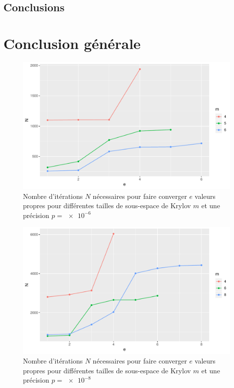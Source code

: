 \documentclass[11pt,a4paper]{article}
\begin{document}
	\subsection{Conclusions}

\section{Conclusion générale}

\begin{figure}
	\centering
	\includegraphics[width=0.8\linewidth, keepaspectratio]{plots/Nvse-m_p6.pdf}
	\caption{Nombre d'itérations $N$ nécessaires pour faire converger $e$ valeurs propres pour différentes tailles de sous-espace de Krylov $m$ et une précision $p=\SI{e-6}{}$ \label{fig:Nvse-m_p6}}
\end{figure}

\begin{figure}
	\centering
	\includegraphics[width=0.8\linewidth, keepaspectratio]{plots/Nvse-m_p8.pdf}
	\caption{Nombre d'itérations $N$ nécessaires pour faire converger $e$ valeurs propres pour différentes tailles de sous-espace de Krylov $m$ et une précision $p=\SI{e-8}{}$ \label{fig:Nvse-m_p8}}
\end{figure}
\end{document}

